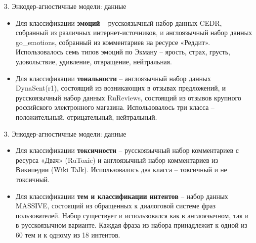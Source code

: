 \begin{frame}{3. Энкодер-агностичные модели: данные}
\begin{itemize}
    \item Для классификации \textbf{эмоций} -- русскоязычный набор данных CEDR, собранный из различных интернет-источников, и англоязычный набор данных go\_emotions, собранный из комментариев на ресурсе «Реддит». Использовалось семь типов эмоций по Экману -- ярость, страх, грусть, удовольствие, удивление, отвращение, нейтральная.
    \item Для классификации \textbf{тональности} -- англоязычный набор данных DynaSent(r1), состоящий из возникающих в отзывах предложений, и русскоязычный набор данных RuReviews, состоящий из отзывов крупного российского электронного магазина. Использовалось три класса -- положительный, отрицательный, нейтральный.
\end{itemize}
\end{frame}

\begin{frame}{3. Энкодер-агностичные модели: данные}
\begin{itemize}
    \item Для классификации \textbf{токсичности} -- русскоязычный набор комментариев с ресурса «Двач» (RuToxic) и англоязычный набор комментариев из Википедии (Wiki Talk). Использовалось два класса -- токсичный и не токсичный.
    \item Для классификации \textbf{тем и классификации интентов} -- набор данных MASSIVE, состоящий из обращенных к диалоговой системе фраз пользователей. Набор существует и использовался как в англоязычном, так и в русскоязычном варианте. Каждая фраза из набора принадлежит к одной из 60 тем и к одному из 18 интентов.
\end{itemize}
\end{frame}

